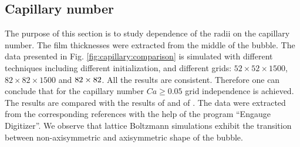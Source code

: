 \documentclass[preprint,12pt]{elsarticle}
\begin{document}
\subsection{Capillary number}
The purpose of this section is to study dependence of the radii on the capillary number. The film
thicknesses were extracted from the middle of the bubble. The data presented in Fig.
\ref{fig:capillary:comparison} is simulated with different techniques including different
initialization, and different grids: $52 \times 52 \times 1500$, $82 \times 82 \times 1500$ and $82
\times 82 \time 2400$. All the results are consistent. Therefore one can conclude that for the
capillary number $Ca\geq
0.05$ grid independence is achieved. The results are compared with the results of
\citet{heil-threedim} and of \citet{wang-non-circular}. The data were extracted from the
corresponding references with the help of the program ``Engauge Digitizer''. We observe that
lattice Boltzmann simulations exhibit 
the transition between non-axisymmetric and axisymmetric shape of the bubble. 
\end{document}
